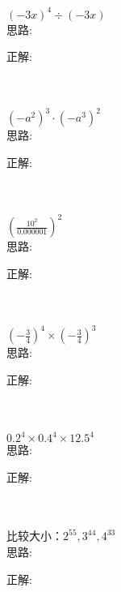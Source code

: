 \item {
    $ (-3x)^{4}\div (-3x) $
    \ifshowSolution
        \fangsong{}
        \\
        思路:

        正解: 
    \else
        \\ \\ \\
    \fi
}

\item {
    $ (-a^2)^{3}\cdot (-a^3)^2 $
    \ifshowSolution
        \fangsong{}
        \\
        思路:

        正解: 
    \else
        \\ \\ \\
    \fi
}

\item {
    $ (\frac{10^2}{0.000001})^{2} $
    \ifshowSolution
        \fangsong{}
        \\
        思路:

        正解: 
    \else
        \\ \\ \\
    \fi
}

\item {
    $ (-\frac{3}{4})^4\times (-\frac{3}{4})^3 $
    \ifshowSolution
        \fangsong{}
        \\
        思路:

        正解: 
    \else
        \\ \\ \\
    \fi
}

\item {
    $ 0.2^4\times 0.4^4 \times 12.5^4 $
    \ifshowSolution
        \fangsong{}
        \\
        思路:

        正解: 
    \else
        \\ \\ \\
    \fi
}

\item {
    比较大小：$ 2^{55}, 3^{44}, 4^{33} $
    \ifshowSolution
        \fangsong{}
        \\
        思路:

        正解: 
    \else
        \\ \\ \\
    \fi
}

